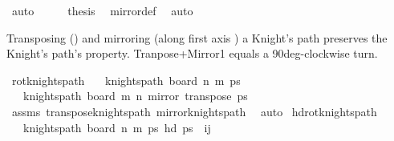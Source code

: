 \begin{isabellebody}
\ auto\isanewline
\ \ \isamarkupfalse%
\ \isamarkupfalse%
\ {\isacharquery}{\kern0pt}thesis\ \isamarkupfalse%
\ mirror{}{\isacharunderscore}{\kern0pt}def\ \isamarkupfalse%
\ auto\isanewline
{}\isamarkupfalse%
%
\endisatagproof
{\isafoldproof}%
%
\isadelimproof
%
\endisadelimproof
%
\isadelimdocument
%
\endisadelimdocument
%
\isatagdocument
%
\isamarkuptrue%
%
\endisatagdocument
{\isafolddocument}%
%
\isadelimdocument
%
\endisadelimdocument
%
\begin{isamarkuptext}%
Transposing () and mirroring (along first axis ) a Knight's path 
preserves the Knight's path's property. Tranpose+Mirror1 equals a 90deg-clockwise turn.%
\end{isamarkuptext}\isamarkuptrue%
\isamarkupfalse%
\ rot{}{}{\isacharunderscore}{\kern0pt}knights{\isacharunderscore}{\kern0pt}path{\isacharcolon}{\kern0pt}\isanewline
\ \ \ {\isachardoublequoteopen}knights{\isacharunderscore}{\kern0pt}path\ {\isacharparenleft}{\kern0pt}board\ n\ m{\isacharparenright}{\kern0pt}\ ps{\isachardoublequoteclose}\ \isanewline
\ \ \ {\isachardoublequoteopen}knights{\isacharunderscore}{\kern0pt}path\ {\isacharparenleft}{\kern0pt}board\ m\ n{\isacharparenright}{\kern0pt}\ {\isacharparenleft}{\kern0pt}mirror{}\ {\isacharparenleft}{\kern0pt}transpose\ ps{\isacharparenright}{\kern0pt}{\isacharparenright}{\kern0pt}{\isachardoublequoteclose}\isanewline
%
\isadelimproof
\ \ %
\endisadelimproof
%
\isatagproof
{}\isamarkupfalse%
\ assms\ transpose{\isacharunderscore}{\kern0pt}knights{\isacharunderscore}{\kern0pt}path\ mirror{}{\isacharunderscore}{\kern0pt}knights{\isacharunderscore}{\kern0pt}path\ \isamarkupfalse%
\ auto%
\endisatagproof
{\isafoldproof}%
%
\isadelimproof
\isanewline
%
\endisadelimproof
\isanewline
{}\isamarkupfalse%
\ hd{\isacharunderscore}{\kern0pt}rot{}{}{\isacharunderscore}{\kern0pt}knights{\isacharunderscore}{\kern0pt}path{\isacharcolon}{\kern0pt}\ \isanewline
\ \ \ {\isachardoublequoteopen}knights{\isacharunderscore}{\kern0pt}path\ {\isacharparenleft}{\kern0pt}board\ n\ m{\isacharparenright}{\kern0pt}\ ps{\isachardoublequoteclose}\ {\isachardoublequoteopen}hd\ ps\ {\isacharequal}{\kern0pt}\ {\isacharparenleft}{\kern0pt}i{\isacharcomma}{\kern0pt}j{\isacharparenright}{\kern0pt}{\isachardoublequoteclose}\isanewline

\end{isabellebody}
